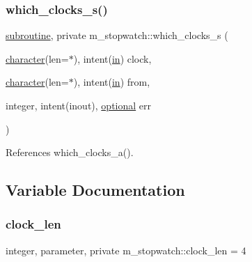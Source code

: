 \subsubsection{\texorpdfstring{which\+\_\+clocks\+\_\+s()}{which\_clocks\_s()}}
{\footnotesize\ttfamily \hyperlink{M__stopwatch_83_8txt_acfbcff50169d691ff02d4a123ed70482}{subroutine}, private m\+\_\+stopwatch\+::which\+\_\+clocks\+\_\+s (\begin{DoxyParamCaption}\item[{\hyperlink{option__stopwatch_83_8txt_abd4b21fbbd175834027b5224bfe97e66}{character}(len=$\ast$), intent(\hyperlink{M__journal_83_8txt_afce72651d1eed785a2132bee863b2f38}{in})}]{clock,  }\item[{\hyperlink{option__stopwatch_83_8txt_abd4b21fbbd175834027b5224bfe97e66}{character}(len=$\ast$), intent(\hyperlink{M__journal_83_8txt_afce72651d1eed785a2132bee863b2f38}{in})}]{from,  }\item[{integer, intent(inout), \hyperlink{option__stopwatch_83_8txt_aa4ece75e7acf58a4843f70fe18c3ade5}{optional}}]{err }\end{DoxyParamCaption})\hspace{0.3cm}{\ttfamily [private]}}



References which\+\_\+clocks\+\_\+a().



\subsection{Variable Documentation}
\mbox{\label{namespacem__stopwatch_aa5f2b7700fd32f070e22af9950c47805}} 
\subsubsection{\texorpdfstring{clock\+\_\+len}{clock\_len}}
{\footnotesize\ttfamily integer, parameter, private m\+\_\+stopwatch\+::clock\+\_\+len = 4\hspace{0.3cm}{\ttfamily [private]}}

\mbox{\label{namespacem__stopwatch_a779dc9ad87f18ac158e8ac6cb47601e4}} 
